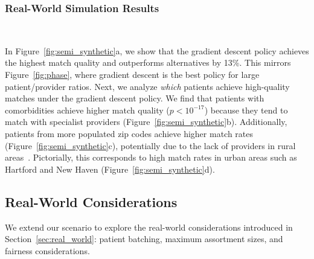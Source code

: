 \subsubsection{Real-World Simulation Results}
\label{sec:semi_synthetic_results}
\begin{figure*}
    \centering 
     \\ 
    \caption{(a) We construct a real-world scenario with $N=1225$ and $M=700$. We find that the gradient descent policy performs best because of the large patient/provider ratio. 
    (b) The gradient descent policy achieves a higher match quality for patients with comorbidities because these patients match with specialist providers. (c) Geographically, the gradient descent policy tends to match patients from more populated zip codes, (d) with the highest match rates occurring in cities such as Hartford and New Haven.} 
    \label{fig:semi_synthetic}
\end{figure*}

In Figure~\ref{fig:semi_synthetic}a, we show that the gradient descent policy achieves the highest match quality and outperforms alternatives by 13\%. 
This mirrors Figure~\ref{fig:phase}, where gradient descent is the best policy for large patient/provider ratios.  
Next, we analyze \textit{which} patients achieve high-quality matches under the gradient descent policy. 
We find that patients with comorbidities achieve higher match quality ($p<10^{-17}$) because they tend to match with specialist providers (Figure~\ref{fig:semi_synthetic}b).
Additionally, patients from more populated zip codes achieve higher match rates (Figure~\ref{fig:semi_synthetic}c), potentially due to the lack of providers in rural areas~\citep{rural_health_care}. 
Pictorially, this corresponds to high match rates in urban areas such as Hartford and New Haven (Figure~\ref{fig:semi_synthetic}d). 

\subsection{Real-World Considerations}
\label{sec:real_world_considerations}
We extend our scenario to explore the real-world considerations introduced in Section~\ref{sec:real_world}: patient batching, maximum assortment sizes, and fairness considerations. 

